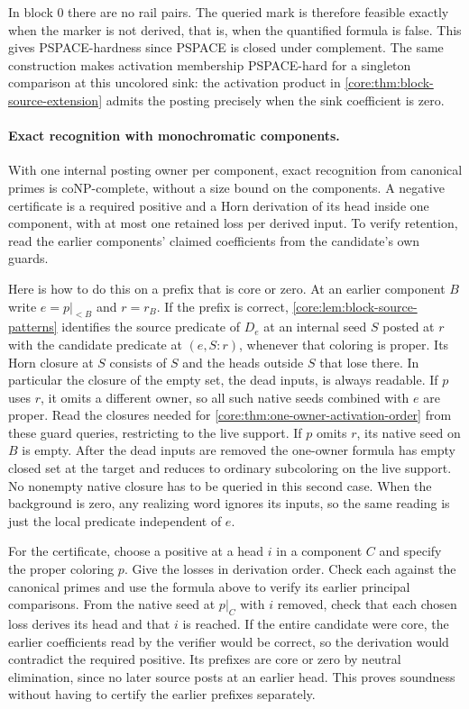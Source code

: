 In block $0$ there are no rail pairs. The queried mark is
therefore feasible exactly when the marker is not derived,
that is, when the quantified formula is false. This gives
PSPACE-hardness since PSPACE is closed under complement.
The same construction makes activation membership
PSPACE-hard for a singleton comparison at this uncolored
sink: the activation product in \cref{core:thm:block-source-extension}
admits the posting precisely when the sink coefficient is zero.

\paragraph{Exact recognition with monochromatic components.}
With one internal posting owner per component, exact
recognition from canonical primes is coNP-complete, without
a size bound on the components. A negative certificate is
a required positive and a Horn derivation of its head inside
one component, with at most one retained loss per derived
input. To verify retention, read the earlier components'
claimed coefficients from the candidate's own guards.

Here is how to do this on a prefix that is core or zero.
At an earlier component $B$ write $e=p|_{<B}$ and $r=r_B$.
If the prefix is correct, \cref{core:lem:block-source-patterns}
identifies the source predicate of $D_e$ at an internal
seed $S$ posted at $r$ with the candidate predicate at
$(e,S:r)$, whenever that coloring is proper. Its Horn
closure at $S$ consists of $S$ and the heads outside $S$
that lose there. In particular the closure of the empty
set, the dead inputs, is always readable. If $p$ uses $r$,
it omits a different owner, so all such native seeds
combined with $e$ are proper. Read the closures needed
for \cref{core:thm:one-owner-activation-order} from these
guard queries, restricting to the live support. If $p$
omits $r$, its native seed on $B$ is empty. After the dead
inputs are removed the one-owner formula has empty closed
set at the target and reduces to ordinary subcoloring
on the live support. No nonempty native closure has to
be queried in this second case.
When the background is zero, any realizing word ignores
its inputs, so the same reading is just the local predicate
independent of $e$.

For the certificate, choose a positive at a head $i$ in
a component $C$ and specify the proper coloring $p$.
Give the losses in derivation order. Check each against
the canonical primes and use the formula above to verify
its earlier principal comparisons. From the native seed
at $p|_C$ with $i$ removed, check that each chosen loss
derives its head and that $i$ is reached. If the entire
candidate were core, the earlier coefficients read by
the verifier would be correct, so the derivation would
contradict the required positive. Its prefixes are core
or zero by neutral elimination, since no later source
posts at an earlier head. This proves soundness
without having to certify the earlier prefixes separately.


